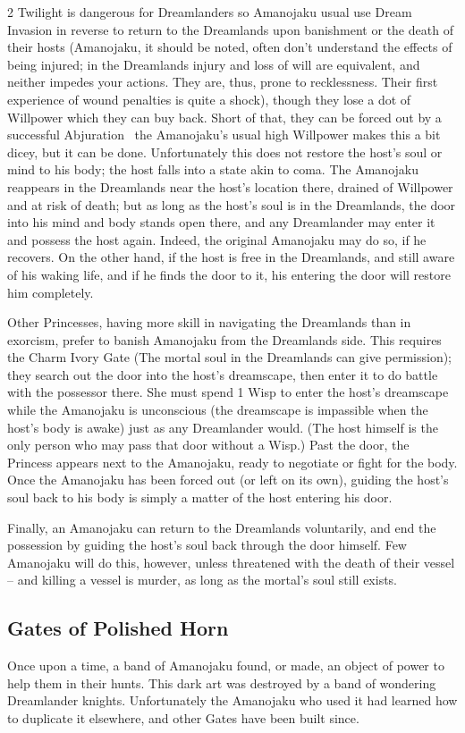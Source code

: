 \begin{multicols}{2}
Twilight is dangerous for Dreamlanders so Amanojaku usual use Dream Invasion in reverse to return to the Dreamlands upon banishment or the death of their hosts (Amanojaku, it should be noted, often don't understand the effects of being injured; in the Dreamlands injury and loss of will are equivalent, and neither impedes your actions. They are, thus, prone to recklessness. Their first experience of wound penalties is quite a shock), though they lose a dot of Willpower which they can buy back. Short of that, they can be forced out by a successful Abjuration \textendash\, the Amanojaku's usual high Willpower makes this a bit dicey, but it can be done. Unfortunately this does not restore the host's soul or mind to his body; the host falls into a state akin to coma. The Amanojaku reappears in the Dreamlands near the host's location there, drained of Willpower and at risk of death; but as long as the host's soul is in the Dreamlands, the door into his mind and body stands open there, and any Dreamlander may enter 
it and possess the host again. 
Indeed, the original 
Amanojaku may do so, if he recovers. On the other 
hand, if the host is free in the Dreamlands, and still aware of his waking life, and if he finds the door to it, his entering the door will restore him completely. 

Other Princesses, having more skill in navigating the Dreamlands than in exorcism, prefer to banish Amanojaku from the Dreamlands side. This requires the Charm Ivory Gate (The mortal soul in the Dreamlands can give permission); they search out the door into the host's dreamscape, then enter it to do battle with the possessor there. She must spend 1 Wisp to enter the host's dreamscape while the Amanojaku is unconscious (the dreamscape is impassible when the host's body is awake) just as any Dreamlander would. (The host himself is the only person who may pass that door without a Wisp.) Past the door, the Princess appears next to the Amanojaku, ready to negotiate or fight for the body. Once the Amanojaku has been forced out (or left on its own), guiding the host's soul back to his body is simply a matter of the host entering his door. 

Finally, an Amanojaku can return to the Dreamlands voluntarily, and end the possession by guiding the host's soul back through the door himself. Few Amanojaku will do this, however, unless threatened with the death of their vessel -- and killing a vessel is murder, as long as the mortal's soul still exists. 

\subsection*{Gates of Polished Horn}
Once upon a time, a band of Amanojaku found, or made, an object of power to help them in their hunts.  This dark art was destroyed by a band of wondering Dreamlander knights.  Unfortunately the Amanojaku who used it had learned how to duplicate it elsewhere, and other Gates have been built since.


\end{multicols}
